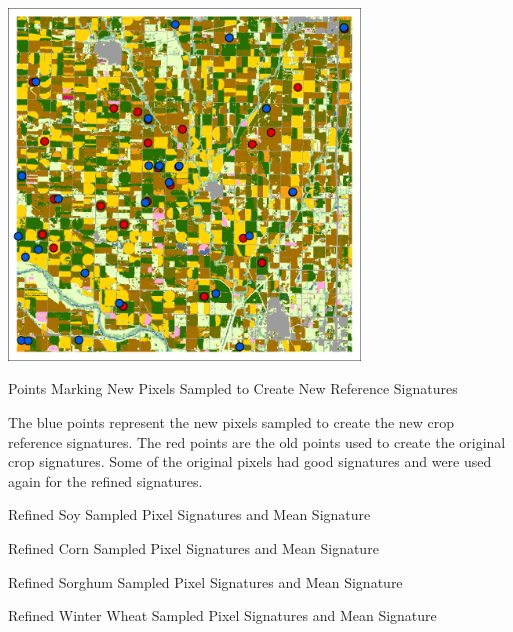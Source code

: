 \begin{ssfigure}
  \centering
  \includegraphics[width=0.7\textwidth]{Graphics/Testing/clip1_MODIS_CDL_smpl_old_wnew.pdf}
  \caption{Points Marking New Pixels Sampled to Create New Reference Signatures}
  \label{fig:newpoints}
  \medskip
  \small
  The blue points represent the new pixels sampled to create the new crop reference signatures. The red points are the old points used to create the original crop signatures. Some of the original pixels had good signatures and were used again for the refined signatures.
\end{ssfigure}


\begin{ssfigure}
  \centering
  
  \caption{Refined Soy Sampled Pixel Signatures and Mean Signature}
    \label{fig:KSsoyrefinedsigs}
\end{ssfigure}

\begin{ssfigure}
  \centering
  
  \caption{Refined Corn Sampled Pixel Signatures and Mean Signature}
    \label{fig:KScornrefinedsigs}
\end{ssfigure}

\begin{ssfigure}
  \centering
  
  \caption{Refined Sorghum Sampled Pixel Signatures and Mean Signature}
    \label{fig:KSsorghumrefinedsigs}
\end{ssfigure}

\begin{ssfigure}
  \centering
  
  \caption{Refined Winter Wheat Sampled Pixel Signatures and Mean Signature}
    \label{fig:KSwheatrefinedsigs}
\end{ssfigure}

